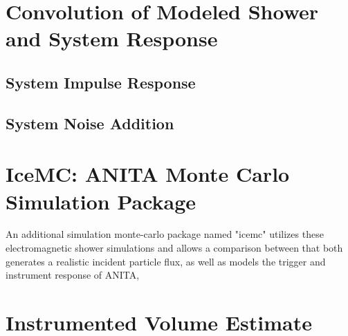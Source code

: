 \section{Convolution of Modeled Shower and System Response}
		
		\subsection{System Impulse Response}
		
		\subsection{System Noise Addition}
		

\section{IceMC: ANITA Monte Carlo Simulation Package}
	An additional simulation monte-carlo package named "icemc" utilizes these electromagnetic shower simulations and allows a comparison between that both generates a realistic incident particle flux, as well as models the trigger and instrument response of ANITA, 
\section{Instrumented Volume Estimate}